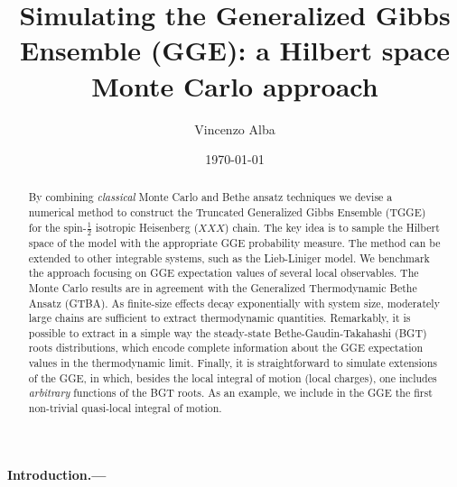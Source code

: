 \documentclass[twocolumn,superscriptaddress,prb,10pt]{revtex4-1}
\begin{document}
\title{Simulating the Generalized Gibbs Ensemble (GGE): a Hilbert space 
Monte Carlo approach} 

\author{Vincenzo Alba}

\date{\today}




\begin{abstract} 

By combining {\it classical} Monte Carlo and Bethe ansatz techniques we devise a numerical 
method to construct the Truncated Generalized Gibbs Ensemble (TGGE) for the spin-$\frac{1}{2}$ 
isotropic Heisenberg ($XXX$) chain. The key idea is to sample the Hilbert space of the model 
with the appropriate GGE probability measure. The method can be extended to other integrable 
systems, such as the Lieb-Liniger model. We benchmark the approach focusing on 
GGE expectation values of several local observables. The Monte Carlo results are in  
agreement with the Generalized Thermodynamic Bethe Ansatz (GTBA). As finite-size effects decay 
exponentially with system size, moderately large chains are sufficient to extract thermodynamic 
quantities. Remarkably, it is possible to extract in a simple way the steady-state Bethe-Gaudin-Takahashi 
(BGT) roots distributions, which encode complete information about the GGE expectation values in 
the thermodynamic limit. Finally, it is straightforward to simulate extensions of the GGE, in which, 
besides the local integral of motion (local charges), one includes {\it arbitrary} functions of the 
BGT roots. As an example, we include in the GGE the first non-trivial quasi-local integral of 
motion. 


\end{abstract}


\maketitle


\paragraph*{Introduction.---}
\end{document}
